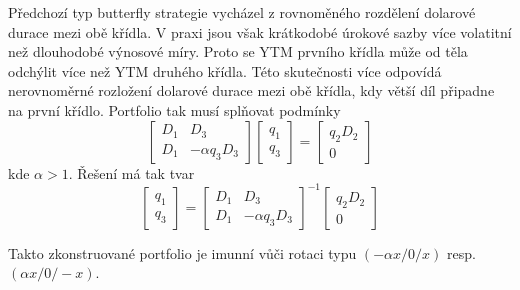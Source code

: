 \documentclass[a4paper]{book}
\begin{document}
Předchozí typ butterfly strategie vycházel z rovnoměného rozdělení dolarové durace mezi obě křídla. V praxi jsou však krátkodobé úrokové sazby více volatitní než dlouhodobé výnosové míry. Proto se YTM prvního křídla může od těla odchýlit více než YTM druhého křídla. Této skutečnosti více odpovídá nerovnoměrné rozložení dolarové durace mezi obě křídla, kdy větší díl připadne na první křídlo. Portfolio tak musí splňovat podmínky
\begin{equation*}
\begin{bmatrix}
D_1 & D_3 \\
D_1 & -\alpha q_3 D_3
\end{bmatrix}
\begin{bmatrix}
q_1 \\
q_3
\end{bmatrix}
=
\begin{bmatrix}
q_2 D_2 \\
0
\end{bmatrix}
\end{equation*}
kde $\alpha > 1$. Řešení má tak tvar
\begin{equation*}
\begin{bmatrix}
q_1 \\
q_3
\end{bmatrix}
=
\begin{bmatrix}
D_1 & D_3 \\
D_1 & -\alpha q_3 D_3
\end{bmatrix}^{-1}
\begin{bmatrix}
q_2 D_2 \\
0
\end{bmatrix}
\end{equation*}

Takto zkonstruované portfolio je imunní vůči rotaci typu $(-\alpha x/0/x)$ resp. $(\alpha x/0/-x)$.
\end{document}
